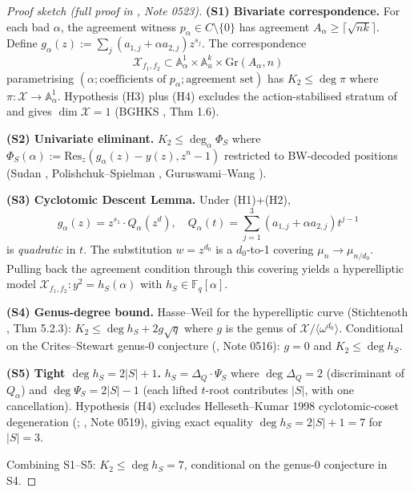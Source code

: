 \documentclass[11pt]{article}
\theoremstyle{definition}
\theoremstyle{remark}
\newcommand{\FF}{\mathbb{F}}
\begin{document}
\begin{proof}[Proof sketch (full proof in \cite{CompanionRepo}, Note 0523)]
\textbf{(S1) Bivariate correspondence.} For each bad $\alpha$, the
agreement witness $p_\alpha \in C \setminus \{0\}$ has agreement
$A_\alpha \geq \lceil\sqrt{nk}\rceil$. Define
$g_\alpha(z) := \sum_j (a_{1,j} + \alpha a_{2,j}) z^{s_j}$. The
correspondence
\[
 \mathcal{X}_{f_1, f_2} \subset \mathbb{A}^1_\alpha \times
 \mathbb{A}^k_u \times \mathrm{Gr}(A_\alpha, n)
\]
parametrising $(\alpha; \text{coefficients of } p_\alpha;
\text{agreement set})$ has $K_2 \leq \deg \pi$ where
$\pi : \mathcal{X} \to \mathbb{A}^1_\alpha$. Hypothesis (H3) plus
(H4) excludes the action-stabilised stratum of \cite{BCIKS} and gives
$\dim \mathcal{X} = 1$ (BGHKS \cite{BGHKS}, Thm 1.6).

\textbf{(S2) Univariate eliminant.}
$K_2 \leq \deg_\alpha \Phi_S$ where
$\Phi_S(\alpha) := \mathrm{Res}_z(g_\alpha(z) - y(z), z^n - 1)$
restricted to BW-decoded positions
(Sudan \cite{Sudan1997}, Polishchuk--Spielman \cite{PolishchukSpielman1994},
Guruswami--Wang \cite{GuruswamiWang2013}).

\textbf{(S3) Cyclotomic Descent Lemma.} Under (H1)+(H2),
\[
 g_\alpha(z) = z^{s_1} \cdot Q_\alpha(z^d), \quad
 Q_\alpha(t) = \sum_{j=1}^3 (a_{1,j} + \alpha a_{2,j}) t^{j-1}
\]
is \emph{quadratic} in $t$. The substitution $w = z^{d_0}$ is a
$d_0$-to-1 covering $\mu_n \to \mu_{n/d_0}$. Pulling back the agreement
condition through this covering yields a hyperelliptic model
$\mathcal{X}_{f_1, f_2} : y^2 = h_S(\alpha)$ with
$h_S \in \FF_q[\alpha]$.

\textbf{(S4) Genus-degree bound.} Hasse--Weil for the hyperelliptic
curve (Stichtenoth \cite{Stichtenoth2009}, Thm 5.2.3):
$K_2 \leq \deg h_S + 2g \sqrt q$ where $g$ is the genus of
$\mathcal{X} / \langle \omega^{d_0} \rangle$. Conditional on the
Crites--Stewart genus-$0$ conjecture (\cite{CompanionRepo}, Note 0516):
$g = 0$ and $K_2 \leq \deg h_S$.

\textbf{(S5) Tight $\deg h_S = 2|S| + 1$.}
$h_S = \Delta_Q \cdot \Psi_S$ where $\deg \Delta_Q = 2$ (discriminant
of $Q_\alpha$) and $\deg \Psi_S = 2|S| - 1$ (each lifted $t$-root
contributes $|S|$, with one cancellation). Hypothesis (H4) excludes
Helleseth--Kumar 1998 cyclotomic-coset degeneration
(\cite{HellesethKumar1998}; \cite{CompanionRepo}, Note 0519), giving
exact equality $\deg h_S = 2|S| + 1 = 7$ for $|S| = 3$.

Combining S1--S5: $K_2 \leq \deg h_S = 7$, conditional on the
genus-$0$ conjecture in S4.
\end{proof}
\end{document}
